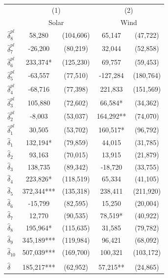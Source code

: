 {
\def\sym#1{\ifmmode^{#1}\else\(^{#1}\)\fi}
\begin{tabular}{l*{2}{cc}}
\toprule
            &\multicolumn{2}{c}{(1)}     &\multicolumn{2}{c}{(2)}     \\
            &\multicolumn{2}{c}{Solar}   &\multicolumn{2}{c}{Wind}    \\
\midrule
$\hat{\delta}_8^{pl}$&      58,280   &   (104,606)&      65,147   &    (47,722)\\
$\hat{\delta}_7^{pl}$&     -26,200   &    (80,219)&      32,044   &    (52,858)\\
$\hat{\delta}_6^{pl}$&     233,374*  &   (125,230)&      69,757   &    (59,453)\\
$\hat{\delta}_5^{pl}$&     -63,557   &    (77,510)&    -127,284   &   (180,764)\\
$\hat{\delta}_4^{pl}$&     -68,716   &    (77,398)&     221,833   &   (151,569)\\
$\hat{\delta}_3^{pl}$&     105,880   &    (72,602)&      66,584*  &    (34,362)\\
$\hat{\delta}_2^{pl}$&      -8,003   &    (53,037)&     164,292** &    (74,070)\\
$\hat{\delta}_1^{pl}$&      30,505   &    (53,702)&     160,517*  &    (96,792)\\
$\hat{\delta}_1$&     132,194*  &    (79,859)&      44,015   &    (31,785)\\
$\hat{\delta}_2$&      93,163   &    (70,015)&      13,915   &    (21,879)\\
$\hat{\delta}_3$&     138,735   &    (89,342)&     -18,720   &    (33,755)\\
$\hat{\delta}_4$&     223,826*  &   (118,519)&      65,334   &    (41,105)\\
$\hat{\delta}_5$&     372,344***&   (135,318)&     238,411   &   (211,920)\\
$\hat{\delta}_6$&     -15,799   &    (82,595)&      15,250   &    (20,004)\\
$\hat{\delta}_7$&      12,770   &    (90,535)&      78,519*  &    (40,922)\\
$\hat{\delta}_8$&     195,964*  &   (115,635)&      31,585   &    (79,782)\\
$\hat{\delta}_9$&     345,189***&   (119,984)&      96,421   &    (68,092)\\
$\hat{\delta}_{10}$&     507,039***&   (169,700)&     100,321   &   (103,172)\\
\addlinespace&               &            &               &            \\
$\hat{\delta}$&     185,217***&    (62,952)&      57,215** &    (24,865)\\
\bottomrule
\end{tabular}
}
